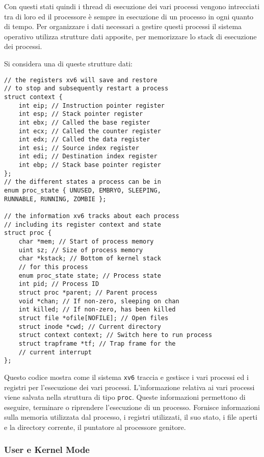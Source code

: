 \documentclass{article}
\numberwithin{equation}{subsection}
\begin{document}

Con questi stati quindi i thread di esecuzione dei vari processi vengono intrecciati tra di loro ed il processore è sempre in esecuzione di un processo in ogni 
quanto di tempo. 
Per organizzare i dati necessari a gestire questi processi il sistema operativo utilizza strutture dati apposite, per memorizzare lo stack di esecuzione dei processi. 

Si considera una di queste strutture dati:
\begin{verbatim}
// the registers xv6 will save and restore
// to stop and subsequently restart a process
struct context {
	int eip; // Instruction pointer register
	int esp; // Stack pointer register
	int ebx; // Called the base register
	int ecx; // Called the counter register
	int edx; // Called the data register
	int esi; // Source index register
	int edi; // Destination index register
	int ebp; // Stack base pointer register
};
// the different states a process can be in
enum proc_state { UNUSED, EMBRYO, SLEEPING,
RUNNABLE, RUNNING, ZOMBIE };

// the information xv6 tracks about each process
// including its register context and state
struct proc {
	char *mem; // Start of process memory
	uint sz; // Size of process memory
	char *kstack; // Bottom of kernel stack
	// for this process
	enum proc_state state; // Process state
	int pid; // Process ID
	struct proc *parent; // Parent process
	void *chan; // If non-zero, sleeping on chan
	int killed; // If non-zero, has been killed
	struct file *ofile[NOFILE]; // Open files
	struct inode *cwd; // Current directory
	struct context context; // Switch here to run process
	struct trapframe *tf; // Trap frame for the
	// current interrupt
};
\end{verbatim}

Questo codice mostra come il sistema \verb|xv6| traccia e gestisce i vari processi ed i registri per l'esecuzione dei vari processi. L'informazione relativa ai 
vari processi viene salvata nella struttura di tipo \verb|proc|. Queste informazioni permettono di eseguire, terminare o riprendere l'esecuzione di un processo. Fornisce 
informazioni sulla memoria utilizzata dal processo, i registri utilizzati, il suo stato, i file aperti e la directory corrente, il puntatore al processore genitore. 

\subsubsection{User e Kernel Mode}
\end{document}
